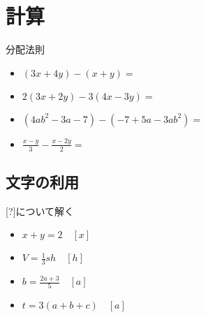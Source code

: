 \documentclass[10pt]{jsarticle}
\begin{document}
\section{計算}
\begin{itembox}[l]{分配法則}
	\begin{Large}
		\begin{itemize}
			\item $(3x+4y)-(x+y)=$
			\item $2(3x+2y)-3(4x-3y)=$
			\item $(4ab^2-3a-7)-(-7+5a-3ab^2)=$
			\item $\frac{x-y}{3}-\frac{x-2y}{2}=$
		\end{itemize}
	\end{Large}
\end{itembox}

\subsection{文字の利用}
\begin{itembox}[l]{[?]について解く}
	\begin{Large}
		\begin{itemize}
			\item $x+y=2 \quad[x]$\\
			\item $V=\frac{1}{3}sh \quad[h]$\\
			\item $b=\frac{2a+3}{5} \quad[a]$\\
			\item $t=3(a+b+c) \quad[a]$\\
		\end{itemize}
	\end{Large}
\end{itembox}
\end{document}
